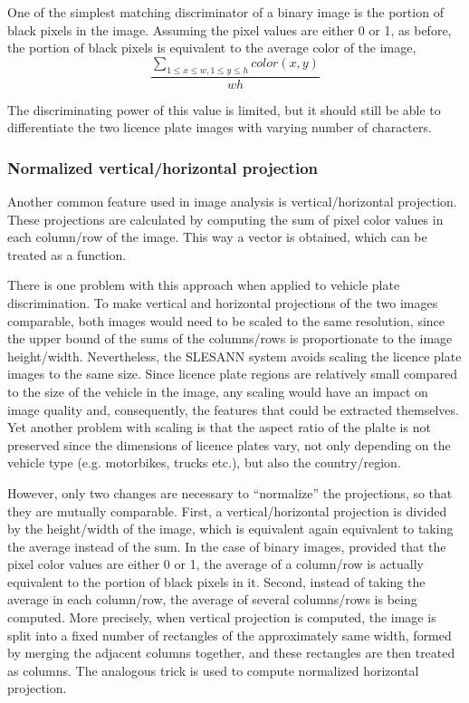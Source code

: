 \documentclass[times, utf8, zavrsni]{fer}
\begin{document}
One of the simplest matching discriminator of a binary image is the portion of
black pixels in the image. Assuming the pixel values are either 0 or 1, as
before, the portion of black pixels is equivalent to the average color of the
image, \[ \frac{\sum_{1 \leq x \leq w, 1 \leq y \leq h}{color(x, y)}}{w h} \]

The discriminating power of this value is limited, but it should still be able
to differentiate the two licence plate images with varying number of
characters.

\subsubsection{Normalized vertical/horizontal projection}

Another common feature used in image analysis is vertical/horizontal
projection. These projections are calculated by computing the sum of pixel
color values in each column/row of the image. This way a vector is obtained,
which can be treated as a function.

There is one problem with this approach when applied to vehicle plate
discrimination. To make vertical and horizontal projections of the two images
comparable, both images would need to be scaled to the same resolution, since
the upper bound of the sums of the columns/rows is proportionate to the image
height/width. Nevertheless, the SLESANN system avoids scaling the licence plate
images to the same size. Since licence plate regions are relatively small
compared to the size of the vehicle in the image, any scaling would have an
impact on image quality and, consequently, the features that could be extracted
themselves. Yet another problem with scaling is that the aspect ratio of the
plalte is not preserved since the dimensions of licence plates vary, not only
depending on the vehicle type (e.g. motorbikes, trucks etc.), but also the
country/region.

However, only two changes are necessary to ``normalize'' the projections, so
that they are mutually comparable. First, a vertical/horizontal projection is
divided by the height/width of the image, which is equivalent again equivalent
to taking the average instead of the sum. In the case of binary images, provided
that the pixel color values are either 0 or 1, the average of a column/row is
actually equivalent to the portion of black pixels in it. Second, instead of
taking the average in each column/row, the average of several columns/rows is
being computed. More precisely, when vertical projection is computed, the image
is split into a fixed number of rectangles of the approximately same width,
formed by merging the adjacent columns together, and these rectangles are then
treated as columns. The analogous trick is used to compute normalized horizontal
projection.
\end{document}
